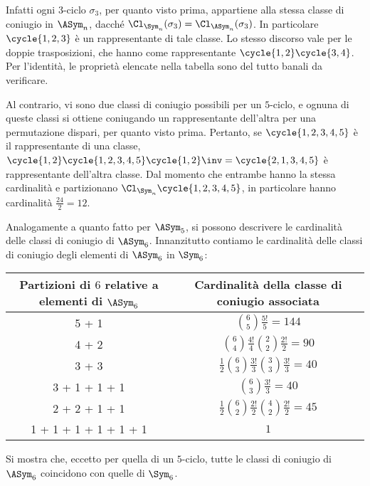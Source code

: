\documentclass[11pt]{scrartcl}
\begin{document}
	Infatti ogni $3$-ciclo $\sigma_3$, per quanto visto prima, appartiene alla stessa classe di
	coniugio in $\ASym_n$, dacché $\Cl_{\Sym_n}(\sigma_3) = \Cl_{\ASym_n}(\sigma_3)$. In
	particolare $\cycle{1, 2, 3}$ è un rappresentante di tale classe. Lo stesso
	discorso vale per le doppie trasposizioni, che hanno come rappresentante
	$\cycle{1, 2}\cycle{3, 4}$. Per l'identità, le proprietà elencate nella tabella sono del tutto banali da verificare. \medskip
	
	
	Al contrario, vi sono due classi di coniugio possibili per un $5$-ciclo, e ognuna di
	queste classi si ottiene coniugando un rappresentante dell'altra per una permutazione
	dispari, per quanto visto prima. Pertanto, se $\cycle{1, 2, 3, 4, 5}$ è il rappresentante di una classe,
	$\cycle{1, 2} \cycle{1, 2, 3, 4, 5} \cycle{1, 2}\inv = \cycle{2, 1, 3, 4, 5}$ è
	rappresentante dell'altra classe. Dal momento che entrambe hanno la stessa cardinalità
	e partizionano $\Cl_{\Sym_n}\cycle{1, 2, 3, 4, 5}$, in particolare hanno cardinalità
	$\frac{24}{2} = 12$. \medskip

	
	Analogamente a quanto fatto per $\ASym_5$, si possono descrivere le cardinalità
	delle classi di coniugio di $\ASym_6$. Innanzitutto contiamo le cardinalità delle
	classi di coniugio degli elementi di $\ASym_6$ in $\Sym_6$:
	
	\begingroup
	\renewcommand{\arraystretch}{2}
	\begin{center}
		\begin{tabular}{c|c}
			Partizioni di $6$ relative a elementi di $\ASym_6$ & Cardinalità della classe di coniugio associata\\
			\hline
			5 + 1 & $\binom{6}{5} \frac{5!}{5} = 144 $ \\
			4 + 2 & $\binom{6}{4} \frac{4!}{4} \binom{2}{2} \frac{2!}{2} = 90$ \\
			3 + 3 & $\frac{1}{2} \binom{6}{3} \frac{3!}{3} \binom{3}{3} \frac{3!}{3} = 40$ \\
			3 + 1 + 1 + 1 & $\binom{6}{3} \frac{3!}{3} = 40$ \\
			2 + 2 + 1 + 1 & $\frac{1}{2} \binom{6}{2} \frac{2!}{2} \binom{4}{2} \frac{2!}{2} = 45$ \\
			1 + 1 + 1 + 1 + 1 + 1 & $1$
		\end{tabular}
	\end{center}
	\endgroup
	
	Si mostra che, eccetto per quella di un $5$-ciclo, tutte le classi di coniugio
	di $\ASym_6$ coincidono con quelle di $\Sym_6$.
	
\end{document}
